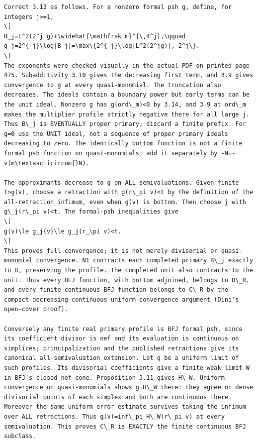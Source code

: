 \documentclass[11pt]{article}
\begin{document}
\begin{Verbatim}[breaklines,fontsize=\tiny]
Correct 3.13 as follows. For a nonzero formal psh g, define, for integers j>=1,
\[
B_j=L^2(2^j g)+\widehat{\mathfrak m}^{\,4^j},\qquad
g_j=2^{-j}\log|B_j|=\max\{2^{-j}\log|L^2(2^jg)|,-2^j\}.
\]
The exponents were checked visually in the actual PDF on printed page 475. Subadditivity 3.10 gives the decreasing first term, and 3.9 gives convergence to g at every quasi-monomial. The truncation also decreases. The ideals contain a boundary power but early terms can be the unit ideal. Nonzero g has g(ord\_m)<0 by 3.14, and 3.9 at ord\_m makes the multiplier profile strictly negative there for all large j. Thus B\_j is EVENTUALLY proper primary; discard a finite prefix. For g=0 use the UNIT ideal, not a sequence of proper primary ideals decreasing to zero. The identically bottom function is not a finite formal psh function on quasi-monomials; add it separately by -N=-v(m\textasciicircum{}N).

The approximants decrease to g on ALL semivaluations. Given finite t>g(v), choose a retraction with g(r\_pi v)<t by the definition of the all-retraction infimum, even when g(v) is bottom. Then choose j with g\_j(r\_pi v)<t. The formal-psh inequalities give
\[
g(v)\le g_j(v)\le g_j(r_\pi v)<t.
\]
This proves full convergence; it is not merely divisorial or quasi-monomial convergence. N1 contracts each completed primary B\_j exactly to R, preserving the profile. The completed unit also contracts to the unit. Thus every BFJ function, with bottom adjoined, belongs to D\_R, and every finite continuous BFJ function belongs to C\_R by the compact decreasing-continuous uniform-convergence argument (Dini's open-cover proof).

Conversely any finite real primary profile is BFJ formal psh, since its coefficient divisor is nef and its evaluation is continuous on simplices; principalization and the published retractions give its canonical all-semivaluation extension. Let g be a uniform limit of such profiles. Its divisorial coefficients give a finite weak limit W in BFJ's closed nef cone. Proposition 3.11 gives H\_W. Uniform convergence on quasi-monomials shows g=H\_W there: they agree on dense divisorial points of each simplex and both are continuous there. Moreover the same uniform error estimate survives taking the infimum over ALL retractions. Thus g(v)=inf\_pi H\_W(r\_pi v) at every semivaluation. This proves C\_R is EXACTLY the finite continuous BFJ subclass.


\end{Verbatim}
\end{document}
